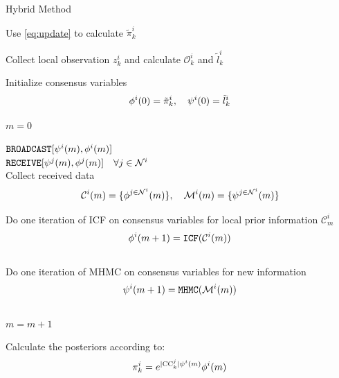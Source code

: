 \documentclass[conference]{IEEEtran}
\theoremstyle{remark}
\newcommand{\yy}[3][2]{\psi^{\tiny #3}({\tiny #2})}
\newcommand{\YY}[3][2]{\phi^{\tiny #3}({\tiny #2})}
\begin{document}
\begin{algorithm}[!ht]
	\label{alg:inf-predict}
	\caption{Hybrid Method}
	Use \eqref{eq:update} to calculate  $\tilde{\pi}^i_{k}$
	
	Collect local observation ${z}^i_{k}$ and calculate ${\mathcal{O}}^i_{k}$ 
	and $\tilde{l}_k^i$
	
	Initialize consensus variables
	\begin{equation*}
	\YY[]{0}{i} = \tilde{\pi}^i_{k}, \quad \yy[]{0}{i} = \tilde{l}_k^i
	\end{equation*}
	
	$m=0$\\
	{ $\texttt{BROADCAST}[ \yy[]{m}{i}, \YY[]{m}{i}]$\\
		$\texttt{RECEIVE}[ \yy[]{m}{j}, \YY[]{m}{j} ] \quad \forall j \in 
		\mathcal{N}^i$\\	
		Collect received data 
		\begin{equation*}
		\mathcal{C}^i(m)=\{  \YY[]{m}{j \in  \mathcal{N}^i} \}, \quad 	
		\mathcal{M}^i(m)=\{  \yy[]{m}{j \in  \mathcal{N}^i} \}
		\end{equation*}
		
		Do one iteration of ICF on consensus variables for local prior 
		information $\mathcal{C}^i_m$
		$$ \YY[]{m+1}{i}=\texttt{ICF}(\mathcal{C}^i(m))$$\\
		Do one iteration of MHMC on consensus variables for new 
		information 		$$ \yy[]{m+1}{i}=\texttt{MHMC}(\mathcal{M}^i(m))$$\\
		$m=m+1$\\
	}
	Calculate the posteriors according to:
	\begin{equation*}
	{\pi}^i_{k} = e^{|\textsc{CC}^j_k|\yy[]{m}{i}}\YY[]{m}{i}
	\end{equation*}
\end{algorithm}
\end{document}
